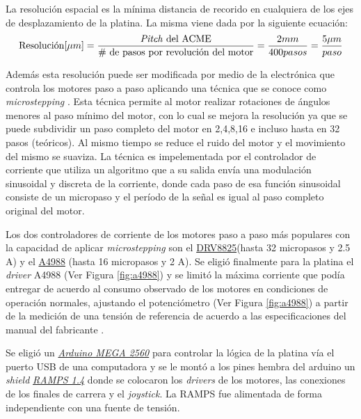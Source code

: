 La resolución espacial es la mínima distancia de recorido en cualquiera de los ejes de desplazamiento de la platina. La misma viene dada por la siguiente ecuación:
\begin{equation}
\text{Resolución} [\mu m] = \frac{\text{\textit{Pitch} del ACME}}{\text{\# de pasos por revolución del motor}} = \frac{2 mm}{400 pasos} = \frac{5 \mu m}{paso}
\end{equation}

Además esta resolución puede ser modificada por medio de la electrónica que controla los motores paso a paso aplicando una técnica que se conoce como \textit{microstepping} \cite{7806244}. Esta técnica permite al motor realizar rotaciones de ángulos menores al paso mínimo del motor, con lo cual se mejora la resolución ya que se puede subdividir un paso completo del motor en 2,4,8,16 e incluso hasta en 32 pasos (teóricos). Al mismo tiempo se reduce el ruido del motor y el movimiento del mismo se suaviza. La técnica es impelementada por el controlador de corriente que utiliza un algoritmo que a su salida envía una modulación sinusoidal y discreta de la corriente, donde cada paso de esa función sinusoidal consiste de un micropaso y el período de la señal es igual al paso completo original del motor.

Los dos controladores de corriente de los motores paso a paso más populares con la capacidad de aplicar \textit{microstepping} son el \href{https://www.pololu.com/product/2133}{DRV8825}(hasta 32 micropasos y 2.5 A) y el \href{https://www.pololu.com/product/1182}{A4988} (hasta 16 micropasos y 2 A). Se eligió finalmente para la platina el \textit{driver} A4988 (Ver Figura \ref{fig:a4988}) y se limitó la máxima corriente que podía entregar de acuerdo al consumo observado de los motores en condiciones de operación normales, ajustando el potenciómetro (Ver Figura \ref{fig:a4988}) a partir de la medición de una tensión de referencia de acuerdo a las especificaciones del manual del fabricante \cite{a4988}.

Se eligió un \href{https://store.arduino.cc/usa/mega-2560-r3}{\textit{Arduino MEGA 2560}} para controlar la lógica de la platina vía el puerto USB de una computadora y se le montó a los pines hembra del arduino un \textit{shield} \href{https://reprap.org/wiki/RAMPS_1.4}{\textit{RAMPS 1.4}} donde se colocaron los \textit{drivers} de los motores, las conexiones de los finales de carrera y el \textit{joystick}. La RAMPS fue alimentada de forma independiente con una fuente de tensión.

